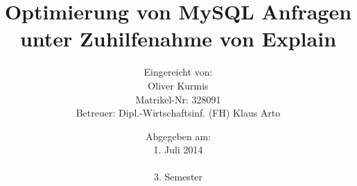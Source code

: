 
\begin{titlepage}
\titlehead{\large FOM Hochschule für Oekonomie \& Management Essen\\ 
Standort München\\
\normalsize Berufsbegleitender Studiengang zum B.Sc. Wirtschaftsinformatik}
\subject{\vspace{1cm}Seminararbeit}
\title{Optimierung von MySQL Anfragen unter Zuhilfenahme von Explain}
\author{
 {\normalsize Eingereicht von:}
   \\Oliver Kurmis\\
  {\normalsize Matrikel-Nr: 328091}\\
  {\normalsize Betreuer: Dipl.-Wirtschaftsinf. (FH) Klaus Arto}
}
\date{{\normalsize Abgegeben am:}\\1. Juli 2014\\\\3. Semester}


\end{titlepage}

\maketitle 

\thispagestyle{empty}
